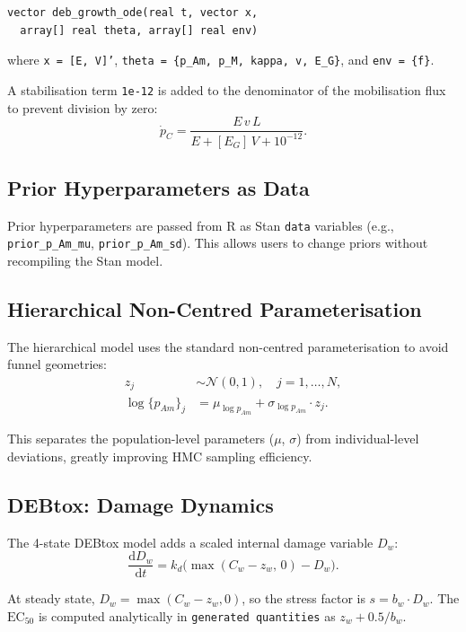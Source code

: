 \documentclass[11pt,a4paper]{article}
\newcommand{\code}[1]{\texttt{#1}}
\newcommand{\R}{\textsf{R}}
\begin{document}
\begin{lstlisting}[style=Stanstyle]
vector deb_growth_ode(real t, vector x,
  array[] real theta, array[] real env)
\end{lstlisting}

where \code{x = [E, V]'}, \code{theta = \{p\_Am, p\_M, kappa, v, E\_G\}},
and \code{env = \{f\}}.

A stabilisation term \code{1e-12} is added to the denominator of the
mobilisation flux to prevent division by zero:
\begin{equation}
\dot{p}_C = \frac{E\,v\,L}{E + [E_G]\,V + 10^{-12}}.
\end{equation}

\subsection{Prior Hyperparameters as Data}

Prior hyperparameters are passed from \R{} as Stan \code{data} variables
(e.g., \code{prior\_p\_Am\_mu}, \code{prior\_p\_Am\_sd}).  This allows
users to change priors without recompiling the Stan model.

\subsection{Hierarchical Non-Centred Parameterisation}

The hierarchical model uses the standard non-centred parameterisation to
avoid funnel geometries:
\begin{align}
  z_j &\sim \mathcal{N}(0, 1), \quad j = 1,\ldots,N, \\
  \log\{p_{Am}\}_j &= \mu_{\log p_{Am}} + \sigma_{\log p_{Am}} \cdot z_j.
\end{align}

This separates the population-level parameters ($\mu$, $\sigma$) from
individual-level deviations, greatly improving HMC sampling efficiency.

\subsection{DEBtox: Damage Dynamics}

The 4-state DEBtox model adds a scaled internal damage variable $D_w$:
\begin{equation}
\frac{\mathrm{d}D_w}{\mathrm{d}t} = k_d\bigl(\max(C_w - z_w,\, 0) - D_w\bigr).
\end{equation}

At steady state, $D_w = \max(C_w - z_w, 0)$, so the stress factor is
$s = b_w \cdot D_w$.  The $\text{EC}_{50}$ is computed analytically in
\code{generated quantities} as $z_w + 0.5/b_w$.
\end{document}
